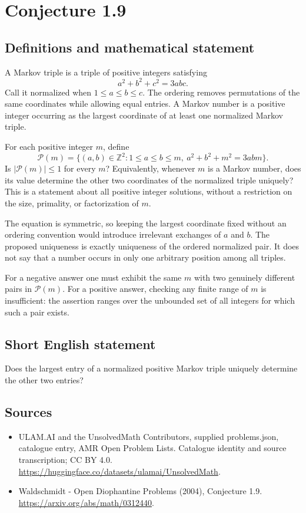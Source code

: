 \documentclass[11pt,a4paper]{article}
\begin{document}
\section*{Conjecture 1.9}\label{statement}

\subsection{Definitions and mathematical statement}
A Markov triple is a triple of positive integers satisfying
\[
a^2+b^2+c^2=3abc.
\]
Call it normalized when $1\le a\le b\le c$. The ordering removes permutations of the same coordinates while allowing equal entries. A Markov number is a positive integer occurring as the largest coordinate of at least one normalized Markov triple.

For each positive integer $m$, define
\[
\mathcal P(m)=\{(a,b)\in\mathbb Z^2:1\le a\le b\le m,
\ a^2+b^2+m^2=3abm\}.
\]
Is $|\mathcal P(m)|\le1$ for every $m$? Equivalently, whenever $m$ is a Markov number, does its value determine the other two coordinates of the normalized triple uniquely? This is a statement about all positive integer solutions, without a restriction on the size, primality, or factorization of $m$.

The equation is symmetric, so keeping the largest coordinate fixed without an ordering convention would introduce irrelevant exchanges of $a$ and $b$. The proposed uniqueness is exactly uniqueness of the ordered normalized pair. It does not say that a number occurs in only one arbitrary position among all triples.

For a negative answer one must exhibit the same $m$ with two genuinely different pairs in $\mathcal P(m)$. For a positive answer, checking any finite range of $m$ is insufficient: the assertion ranges over the unbounded set of all integers for which such a pair exists.
\subsection{Short English statement}
Does the largest entry of a normalized positive Markov triple uniquely determine the other two entries?
\subsection{Sources}
\begin{itemize}
\item[S1] ULAM.AI and the UnsolvedMath Contributors, supplied problems.json, catalogue entry, AMR Open Problem Lists. Catalogue identity and source transcription; CC BY 4.0.
\url{https://huggingface.co/datasets/ulamai/UnsolvedMath}.
\item[S2] Waldschmidt - Open Diophantine Problems (2004), Conjecture 1.9. 
\url{https://arxiv.org/abs/math/0312440}.
\end{itemize}
\end{document}
